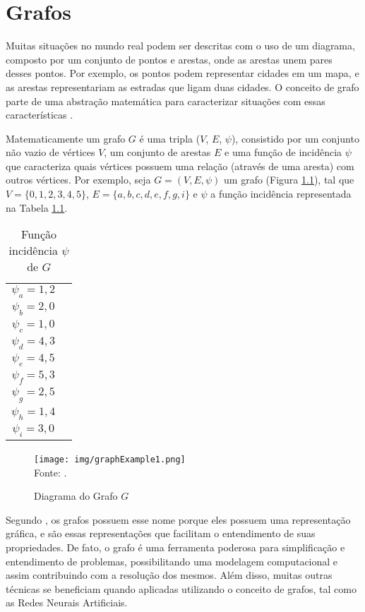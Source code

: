 \chapter{Grafos}
\label{app:grafos}
Muitas situações no mundo real podem ser descritas com o uso de um diagrama, composto por um conjunto de pontos e arestas, onde as arestas unem pares desses pontos. Por exemplo, os pontos podem representar cidades em um mapa, e as arestas representariam as estradas que ligam duas cidades. O conceito de grafo parte de uma abstração matemática para caracterizar situações com essas características \citep{Bondy1976}.

Matematicamente um grafo $G$ é uma tripla ($V$, $E$, $\psi$), consistido por um conjunto não vazio de vértices $V$, um conjunto de arestas $E$ e uma função de incidência $\psi$ que caracteriza quais vértices possuem uma relação (através de uma aresta) com outros vértices. Por exemplo, seja $G = (V, E, \psi)$ um grafo (Figura \ref{fig:graphExample1}), tal que $V = \{0, 1, 2, 3, 4, 5\}$, $E = \{a, b, c, d, e, f, g, i\}$ e $\psi$ a função incidência representada na Tabela \ref{tab:graphExample1}.

\begin{table}[ht!]
\caption{Função incidência $\psi$ de $G$}
\label{tab:graphExample1}
\centering
\begin{tabular}{| c | c |}
\hline
    $\psi_a = 1,2$\\ 
    $\psi_b = 2,0$\\ 
    $\psi_c = 1,0$\\ 
    $\psi_d = 4,3$\\
    $\psi_e = 4,5$\\
    $\psi_f = 5,3$\\
    $\psi_g = 2,5$\\
    $\psi_h = 1,4$\\
    $\psi_i = 3,0$\\
\hline
\end{tabular}
{\fontsize{11pt}{\baselineskip}\selectfont
}
\end{table}

\begin{figure}[ht!]
\caption{Diagrama do Grafo $G$}
\label{fig:graphExample1}
\centering
\texttt{[image: img/graphExample1.png]}
{\fontsize{11pt}{\baselineskip}\selectfont
\\Fonte: \cite{graphOnline}.
}
\end{figure}

Segundo \cite{Bondy1976}, os grafos possuem esse nome porque eles possuem uma representação gráfica, e são essas representações que facilitam o entendimento de suas propriedades. De fato, o grafo é uma ferramenta poderosa para simplificação e entendimento de problemas, possibilitando uma modelagem computacional e assim contribuindo com a resolução dos mesmos. Além disso, muitas outras técnicas se beneficiam quando aplicadas utilizando o conceito de grafos, tal como as Redes Neurais Artificiais.